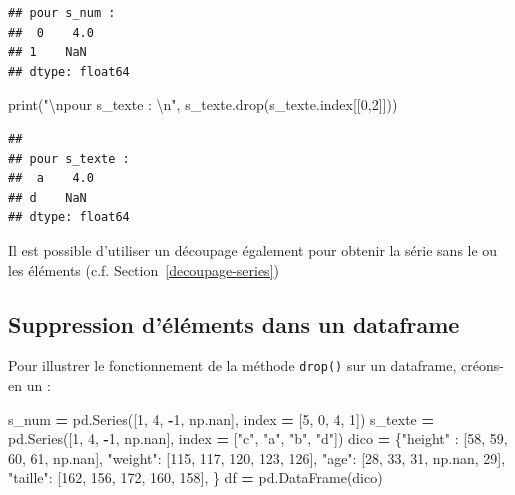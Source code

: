 \documentclass[
  12pt,
]{book}
\newenvironment{Shaded}{\begin{snugshade}}{\end{snugshade}}
\newcommand{\BuiltInTok}[1]{#1}
\newcommand{\CharTok}[1]{\textcolor[rgb]{0.31,0.60,0.02}{#1}}
\newcommand{\DecValTok}[1]{\textcolor[rgb]{0.00,0.00,0.81}{#1}}
\newcommand{\NormalTok}[1]{#1}
\newcommand{\OperatorTok}[1]{\textcolor[rgb]{0.81,0.36,0.00}{\textbf{#1}}}
\newcommand{\StringTok}[1]{\textcolor[rgb]{0.31,0.60,0.02}{#1}}
\numberwithin{equation}{section}
\numberwithin{countremarque}{section}
\begin{document}
\begin{lstlisting}
## pour s_num : 
##  0    4.0
## 1    NaN
## dtype: float64
\end{lstlisting}

\begin{Shaded}
\begin{Highlighting}[]
\BuiltInTok{print}\NormalTok{(}\StringTok{"}\CharTok{\textbackslash{}n}\StringTok{pour s\_texte : }\CharTok{\textbackslash{}n}\StringTok{"}\NormalTok{, s\_texte.drop(s\_texte.index[[}\DecValTok{0}\NormalTok{,}\DecValTok{2}\NormalTok{]]))}
\end{Highlighting}
\end{Shaded}

\begin{lstlisting}
## 
## pour s_texte : 
##  a    4.0
## d    NaN
## dtype: float64
\end{lstlisting}

Il est possible d'utiliser un découpage également pour obtenir la série sans le ou les éléments (c.f. Section~\ref{decoupage-series})

\subsection{Suppression d'éléments dans un dataframe}\label{suppression-duxe9luxe9ments-dans-un-dataframe}

Pour illustrer le fonctionnement de la méthode \texttt{drop()} sur un dataframe, créons-en un :

\begin{Shaded}
\begin{Highlighting}[]
\NormalTok{s\_num }\OperatorTok{=}\NormalTok{ pd.Series([}\DecValTok{1}\NormalTok{, }\DecValTok{4}\NormalTok{, }\OperatorTok{{-}}\DecValTok{1}\NormalTok{, np.nan],}
\NormalTok{             index }\OperatorTok{=}\NormalTok{ [}\DecValTok{5}\NormalTok{, }\DecValTok{0}\NormalTok{, }\DecValTok{4}\NormalTok{, }\DecValTok{1}\NormalTok{])}
\NormalTok{s\_texte }\OperatorTok{=}\NormalTok{ pd.Series([}\DecValTok{1}\NormalTok{, }\DecValTok{4}\NormalTok{, }\OperatorTok{{-}}\DecValTok{1}\NormalTok{, np.nan],}
\NormalTok{             index }\OperatorTok{=}\NormalTok{ [}\StringTok{"c"}\NormalTok{, }\StringTok{"a"}\NormalTok{, }\StringTok{"b"}\NormalTok{, }\StringTok{"d"}\NormalTok{])}
\NormalTok{dico }\OperatorTok{=}\NormalTok{ \{}\StringTok{"height"}\NormalTok{ : [}\DecValTok{58}\NormalTok{, }\DecValTok{59}\NormalTok{, }\DecValTok{60}\NormalTok{, }\DecValTok{61}\NormalTok{, np.nan],}
        \StringTok{"weight"}\NormalTok{: [}\DecValTok{115}\NormalTok{, }\DecValTok{117}\NormalTok{, }\DecValTok{120}\NormalTok{, }\DecValTok{123}\NormalTok{, }\DecValTok{126}\NormalTok{],}
        \StringTok{"age"}\NormalTok{: [}\DecValTok{28}\NormalTok{, }\DecValTok{33}\NormalTok{, }\DecValTok{31}\NormalTok{, np.nan, }\DecValTok{29}\NormalTok{],}
        \StringTok{"taille"}\NormalTok{: [}\DecValTok{162}\NormalTok{, }\DecValTok{156}\NormalTok{, }\DecValTok{172}\NormalTok{, }\DecValTok{160}\NormalTok{, }\DecValTok{158}\NormalTok{],}
\NormalTok{       \} }
\NormalTok{df }\OperatorTok{=}\NormalTok{ pd.DataFrame(dico)}
\end{Highlighting}
\end{Shaded}
\end{document}
